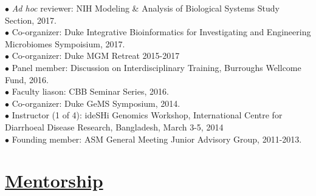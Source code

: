 \documentclass[overlapped,line,11pt]{res}
\begin{document}
\begin{resume}
\vspace{-10mm} \hangindent=0.5in $\bullet$\hspace{.1in} \emph{Ad hoc} reviewer:
NIH Modeling \& Analysis of Biological Systems Study Section, 2017. \\

\vspace{-10mm} \hangindent=0.5in $\bullet$\hspace{.1in} Co-organizer:
Duke Integrative Bioinformatics for Investigating and Engineering
Microbiomes Sympoisium, 2017. \\

\vspace{-10mm}
\hangindent=0.5in $\bullet$\hspace{.1in} Co-organizer: 
 Duke MGM Retreat 2015-2017 \\

\vspace{-10mm} \hangindent=0.5in $\bullet$\hspace{.1in} Panel member:
Discussion on Interdisciplinary Training, Burroughs Wellcome Fund, 2016. \\

\vspace{-10mm}
\hangindent=0.5in $\bullet$\hspace{.1in} Faculty liason: CBB Seminar Series, 2016. \\

\vspace{-10mm}
\hangindent=0.5in $\bullet$\hspace{.1in} Co-organizer: Duke GeMS
Symposium, 2014. \\

\vspace{-10mm}
\hangindent=0.5in $\bullet$\hspace{.1in} Instructor (1 of 4): ideSHi
Genomics Workshop, International Centre for Diarrhoeal
Disease Research, Bangladesh, March 3-5, 2014 \\

\vspace{-10mm}
\hangindent=0.5in $\bullet$\hspace{.1in} Founding member: ASM General Meeting
Junior Advisory Group, 2011-2013. 

\section{\underline{\sc Mentorship}}
\vspace{.1in}


\end{resume}
\end{document}
